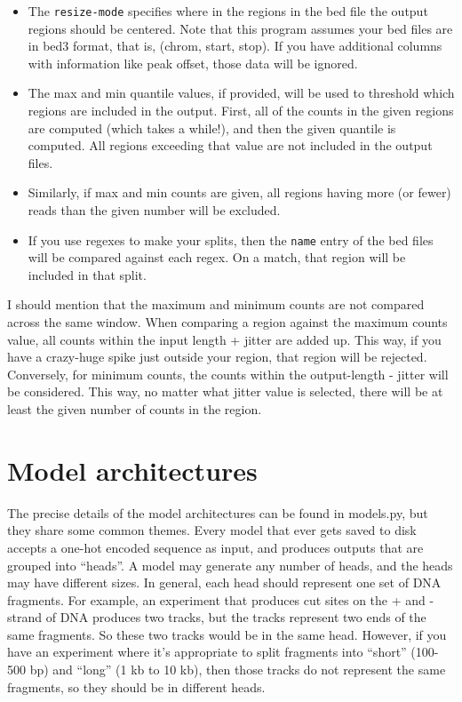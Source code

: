 \documentclass{article}
\begin{document}
\begin{itemize}
    \item The \texttt{resize-mode} specifies where in the regions in the bed file the output regions should be centered. Note that this program assumes your bed files are in bed3 format, that is, (chrom, start, stop). If you have additional columns with information like peak offset, those data will be ignored. 
    \item The max and min quantile values, if provided, will be used to threshold which regions are included in the output. First, all of the counts in the given regions are computed (which takes a while!), and then the given quantile is computed. All regions exceeding that value are not included in the output files. 
    \item Similarly, if max and min counts are given, all regions having more (or fewer) reads than the given number will be excluded. 
    \item If you use regexes to make your splits, then the \texttt{name} entry of the bed files will be compared against each regex. On a match, that region will be included in that split. 
\end{itemize}

I should mention that the maximum and minimum counts are not compared across the same window. 
When comparing a region against the maximum counts value, all counts within the input length + jitter are added up. This way, if you have a crazy-huge spike just outside your region, that region will be rejected. 
Conversely, for minimum counts, the counts within the output-length - jitter will be considered. This way, no matter what jitter value is selected, there will be at least the given number of counts in the region. 






\newpage
\section{Model architectures}\label{sec:modelArchitectures}

The precise details of the model architectures can be found in models.py, but they share some common themes. 
Every model that ever gets saved to disk accepts a one-hot encoded sequence as input, and produces outputs that are grouped into ``heads''. 
A model may generate any number of heads, and the heads may have different sizes. 
In general, each head should represent one set of DNA fragments. For example, an experiment that produces cut sites on the + and - strand of DNA produces
two tracks, but the tracks represent two ends of the same fragments. So these two tracks would be in the same head. 
However, if you have an experiment where it's appropriate to split fragments into ``short'' (100-500 bp) and ``long'' (1 kb to 10 kb), then 
those tracks do not represent the same fragments, so they should be in different heads. 
\end{document}
